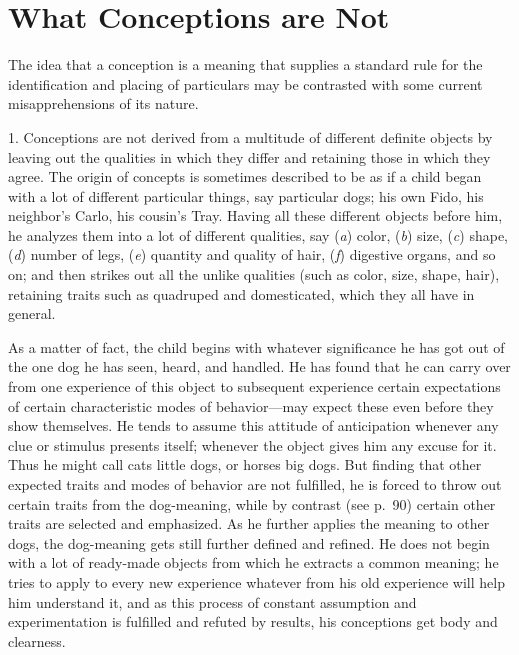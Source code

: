 \documentclass[showtrims,ustradepaper]{memoir}
\begin{document}
\section{What Conceptions are Not}

The idea that a conception is a meaning that supplies a standard rule
for the identification and placing of particulars may be contrasted with
some current misapprehensions of its nature.


1. Conceptions are not derived from a multitude
of
different definite objects by leaving out the qualities in which they
differ and retaining those in which they agree. The origin of concepts
is sometimes described to be as if a child began with a lot of different
particular things, say particular dogs; his own Fido, his neighbor's
Carlo, his cousin's Tray. Having all these different objects before him,
he analyzes them into a lot of different qualities, say (\emph{a})
color, (\emph{b}) size, (\emph{c}) shape, (\emph{d}) number of legs,
(\emph{e}) quantity and quality of hair, (\emph{f}) digestive organs,
and so on; and then strikes out all the unlike qualities (such as color,
size, shape, hair), retaining traits such as quadruped and domesticated,
which they all have in general.


As a matter of fact, the child begins with whatever significance he has
got out of the one dog he has seen, heard, and handled. He has found
that he can carry over from one experience of this object to subsequent
experience certain expectations of certain characteristic modes of
behavior---may expect these even before they show themselves. He tends
to assume this attitude of anticipation whenever any clue or stimulus
presents itself; whenever the object gives him any excuse for it. Thus
he might call cats little dogs, or horses big dogs. But finding that
other expected traits and modes of behavior are not fulfilled, he is
forced to throw out certain traits from the dog-meaning, while by
contrast (see p.\ 90) certain other traits are selected and emphasized.
As he further applies the meaning to other dogs, the dog-meaning gets
still further defined and refined. He does not begin with a lot of
ready-made objects from which he extracts a common meaning; he tries to
apply to every new experience whatever from his old experience will help
him understand
it,
and as this process of constant assumption and experimentation is
fulfilled and refuted by results, his conceptions get body and
clearness.
\end{document}
